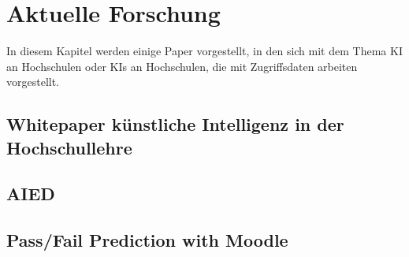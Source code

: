 \chapter{Aktuelle Forschung}
In diesem Kapitel werden einige Paper vorgestellt, in den sich mit dem Thema KI an Hochschulen oder KIs an Hochschulen, die mit Zugriffsdaten arbeiten vorgestellt.

\section{Whitepaper künstliche Intelligenz in der Hochschullehre}

\section{AIED}

\section{Pass/Fail Prediction with Moodle}
